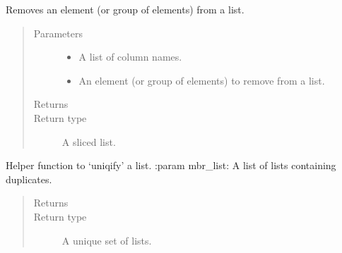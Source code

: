 \documentclass[letterpaper,10pt,english]{sphinxmanual}
\begin{document}
\begin{fulllineitems}
\label{\detokenize{index:ListManagement.utility.sf_helper.headers_clean_up}}
Removes an element (or group of elements) from a list.
\begin{quote}\begin{description}
\item[{Parameters}] \leavevmode\begin{itemize}
\item {} 
 \textendash{} A list of column names.

\item {} 
 \textendash{} An element (or group of elements) to remove from a list.

\end{itemize}

\item[{Returns}] \leavevmode


\item[{Return type}] \leavevmode
A sliced list.

\end{description}\end{quote}

\end{fulllineitems}


\begin{fulllineitems}
\label{\detokenize{index:ListManagement.utility.sf_helper.remove_duplicates}}
Helper function to ‘uniqify’ a list.
:param mbr\_list: A list of lists containing duplicates.
\begin{quote}\begin{description}
\item[{Returns}] \leavevmode


\item[{Return type}] \leavevmode
A unique set of lists.

\end{description}\end{quote}

\end{fulllineitems}
\end{document}
